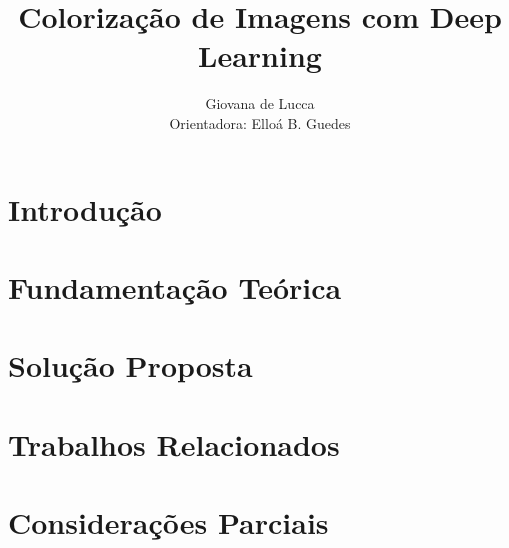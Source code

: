 \documentclass[12pt]{article}
\title{Colorização de Imagens com Deep Learning}
\author{Giovana de Lucca\\Orientadora: Elloá B. Guedes}
\begin{document}
\maketitle

\section{Introdução} \label{sec:introducao}


\section{Fundamentação Teórica} \label{sec:fundamentacao}


\section{Solução Proposta} \label{sec:solucao}


\section{Trabalhos Relacionados} \label{sec:relacionados}


\section{Considerações Parciais} \label{sec:consideracoes}



\end{document}
